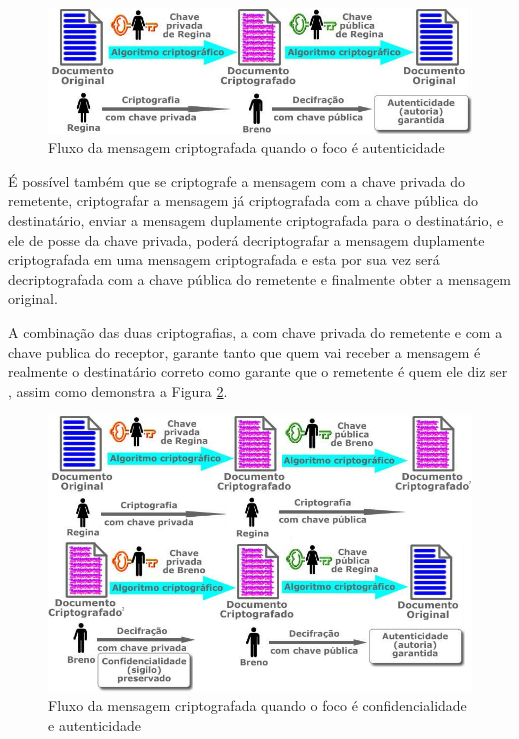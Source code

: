 \begin{figure}[H]
    \centering
    \caption{Fluxo da mensagem criptografada quando o foco é autenticidade}
    \label{fig:cripfocoauten}
    \includegraphics[width=.8\linewidth]{Figuras/Autencidade.png}
\end{figure}

É possível também que se criptografe a mensagem com a chave privada do remetente, criptografar a mensagem já criptografada com a chave pública do destinatário, enviar a mensagem duplamente criptografada para o destinatário, e ele de posse da chave privada, poderá decriptografar a mensagem duplamente criptografada em uma mensagem criptografada e esta por sua vez será decriptografada com a chave pública do remetente e finalmente obter a mensagem original.

A combinação das duas criptografias, a com chave privada do remetente e com a chave publica do receptor, garante tanto que quem vai receber a mensagem é realmente o destinatário correto como garante que o remetente é quem ele diz ser \cite{stallings14} \cite{tanenbaum03}, assim como demonstra a Figura \ref{fig:cripfococonfieauten}.

\begin{figure}[H]
    \centering
    \caption{Fluxo da mensagem criptografada quando o foco é confidencialidade e autenticidade}
    \label{fig:cripfococonfieauten}
    \includegraphics[width=.8\linewidth]{Figuras/ConfidEAuten.png}
\end{figure}

